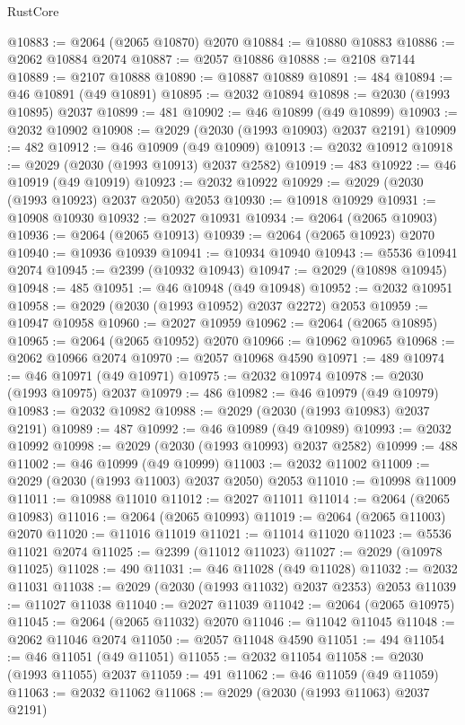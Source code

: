 \begin{lexlean}{RustCore}
\begin{coremodule}
@10883 := @2064 (@2065 @10870) @2070
@10884 := @10880 @10883
@10886 := @2062 @10884 @2074
@10887 := @2057 @10886
@10888 := @2108 @7144
@10889 := @2107 @10888
@10890 := @10887 @10889
@10891 := 484
@10894 := @46 @10891 (@49 @10891)
@10895 := @2032 @10894
@10898 := @2030 (@1993 @10895) @2037
@10899 := 481
@10902 := @46 @10899 (@49 @10899)
@10903 := @2032 @10902
@10908 := @2029 (@2030 (@1993 @10903) @2037 @2191)
@10909 := 482
@10912 := @46 @10909 (@49 @10909)
@10913 := @2032 @10912
@10918 := @2029 (@2030 (@1993 @10913) @2037 @2582)
@10919 := 483
@10922 := @46 @10919 (@49 @10919)
@10923 := @2032 @10922
@10929 := @2029 (@2030 (@1993 @10923) @2037 @2050) @2053
@10930 := @10918 @10929
@10931 := @10908 @10930
@10932 := @2027 @10931
@10934 := @2064 (@2065 @10903)
@10936 := @2064 (@2065 @10913)
@10939 := @2064 (@2065 @10923) @2070
@10940 := @10936 @10939
@10941 := @10934 @10940
@10943 := @5536 @10941 @2074
@10945 := @2399 (@10932 @10943)
@10947 := @2029 (@10898 @10945)
@10948 := 485
@10951 := @46 @10948 (@49 @10948)
@10952 := @2032 @10951
@10958 := @2029 (@2030 (@1993 @10952) @2037 @2272) @2053
@10959 := @10947 @10958
@10960 := @2027 @10959
@10962 := @2064 (@2065 @10895)
@10965 := @2064 (@2065 @10952) @2070
@10966 := @10962 @10965
@10968 := @2062 @10966 @2074
@10970 := @2057 @10968 @4590
@10971 := 489
@10974 := @46 @10971 (@49 @10971)
@10975 := @2032 @10974
@10978 := @2030 (@1993 @10975) @2037
@10979 := 486
@10982 := @46 @10979 (@49 @10979)
@10983 := @2032 @10982
@10988 := @2029 (@2030 (@1993 @10983) @2037 @2191)
@10989 := 487
@10992 := @46 @10989 (@49 @10989)
@10993 := @2032 @10992
@10998 := @2029 (@2030 (@1993 @10993) @2037 @2582)
@10999 := 488
@11002 := @46 @10999 (@49 @10999)
@11003 := @2032 @11002
@11009 := @2029 (@2030 (@1993 @11003) @2037 @2050) @2053
@11010 := @10998 @11009
@11011 := @10988 @11010
@11012 := @2027 @11011
@11014 := @2064 (@2065 @10983)
@11016 := @2064 (@2065 @10993)
@11019 := @2064 (@2065 @11003) @2070
@11020 := @11016 @11019
@11021 := @11014 @11020
@11023 := @5536 @11021 @2074
@11025 := @2399 (@11012 @11023)
@11027 := @2029 (@10978 @11025)
@11028 := 490
@11031 := @46 @11028 (@49 @11028)
@11032 := @2032 @11031
@11038 := @2029 (@2030 (@1993 @11032) @2037 @2353) @2053
@11039 := @11027 @11038
@11040 := @2027 @11039
@11042 := @2064 (@2065 @10975)
@11045 := @2064 (@2065 @11032) @2070
@11046 := @11042 @11045
@11048 := @2062 @11046 @2074
@11050 := @2057 @11048 @4590
@11051 := 494
@11054 := @46 @11051 (@49 @11051)
@11055 := @2032 @11054
@11058 := @2030 (@1993 @11055) @2037
@11059 := 491
@11062 := @46 @11059 (@49 @11059)
@11063 := @2032 @11062
@11068 := @2029 (@2030 (@1993 @11063) @2037 @2191)

\end{coremodule}
\end{lexlean}
